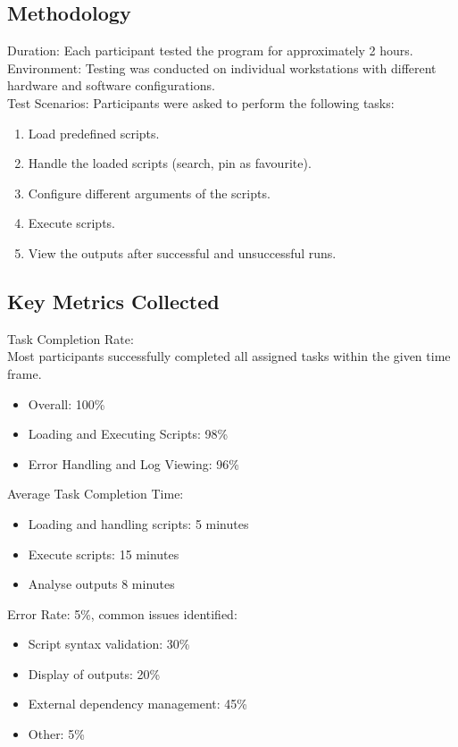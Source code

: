\documentclass{article}
\begin{document}
\subsection{Methodology}
Duration: Each participant tested the program for approximately 2 hours. \\
Environment: Testing was conducted on individual workstations with different hardware and software configurations. \\
Test Scenarios: Participants were asked to perform the following tasks:
\begin{enumerate}
    \item Load predefined scripts.
    \item Handle the loaded scripts (search, pin as favourite).
    \item Configure different arguments of the scripts.
    \item Execute scripts.
    \item View the outputs after successful and unsuccessful runs.
\end{enumerate}

\subsection{Key Metrics Collected}
Task Completion Rate: \\
Most participants successfully completed all assigned tasks within the given time frame.
\begin{itemize}
    \item Overall: 100\%
    \item Loading and Executing Scripts: 98\%
    \item Error Handling and Log Viewing: 96\%
\end{itemize}

\noindent Average Task Completion Time:
\begin{itemize}
    \item Loading and handling scripts: 5 minutes
    \item Execute scripts: 15 minutes
    \item Analyse outputs 8 minutes
\end{itemize}

\noindent Error Rate: 5\%, common issues identified:
\begin{itemize}
    \item Script syntax validation: 30\%
    \item Display of outputs: 20\%
    \item External dependency management: 45\%
    \item Other: 5\%
\end{itemize}
\end{document}
